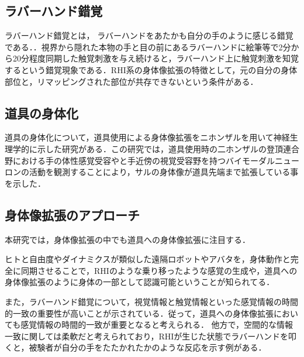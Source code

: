 \begin{small}
    \subsection{ラバーハンド錯覚} %
      ラバーハンド錯覚とは， ラバーハンドをあたかも自分の手のように感じる錯覚である．．視界から隠れた本物の手と目の前にあるラバーハンドに絵筆等で2分から20分程度同期した触覚刺激を与え続けると，ラバーハンド上に触覚刺激を知覚するという錯覚現象である．RHI系の身体像拡張の特徴として，元の自分の身体部位と，リマッピングされた部位が共存できないという条件がある．

    \subsection{道具の身体化} %
      道具の身体化について，道具使用による身体像拡張をニホンザルを用いて神経生理学的に示した研究がある\cite{iriki1996coding}．この研究では，道具使用時の二ホンザルの登頂連合野における手の体性感覚受容やと手近傍の視覚受容野を持つバイモーダルニューロンの活動を観測することにより，サルの身体像が道具先端まで拡張している事を示した．



  \subsection{身体像拡張のアプローチ} 
    本研究では，身体像拡張の中でも道具への身体像拡張に注目する．

    ヒトと自由度やダイナミクスが類似した遠隔ロボットやアバタを，身体動作と完全に同期させることで，RHIのような乗り移ったような感覚の生成や，道具への身体像拡張のように身体の一部として認識可能ということが知られてる．

    また，ラバーハンド錯覚について，視覚情報と触覚情報といった感覚情報の時間的一致の重要性が高いことが示されている\cite{ehrsson2007experimental}．従って，道具への身体像拡張においても感覚情報の時間的一致が重要となると考えられる．
    他方で，空間的な情報一致に関しては柔軟だと考えられており，RHIが生じた状態でラバーハンドを叩くと，被験者が自分の手をたたかれたかのような反応を示す例がある\cite{armel2003projecting}．


\end{small}
